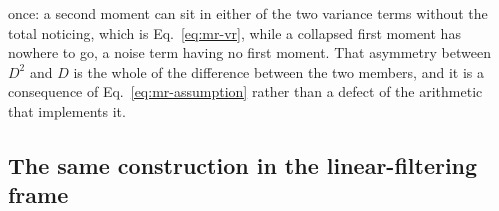 \begin{appendixbox}
once: a second moment can sit in either of the two variance terms without the total noticing,
which is Eq.~\ref{eq:mr-vr}, while a collapsed first moment has nowhere to go, a noise term having
no first moment. That asymmetry between $D^2$ and $D$ is the whole of the difference between the
two members, and it is a consequence of Eq.~\ref{eq:mr-assumption} rather than a defect of the
arithmetic that implements it.


\subsection*{The same construction in the linear-filtering frame}


\end{appendixbox}
